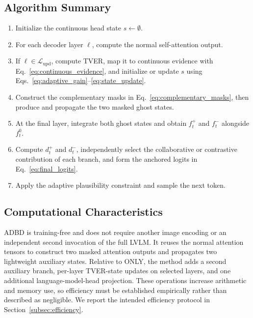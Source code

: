 \subsection{Algorithm Summary}

\begin{enumerate}
    \item Initialize the continuous head state $s\leftarrow\emptyset$.
    \item For each decoder layer $\ell$, compute the normal self-attention output.
    \item If $\ell\in\mathcal{L}_{\mathrm{upd}}$, compute TVER, map it to continuous evidence with Eq.~\eqref{eq:continuous_evidence}, and initialize or update $s$ using Eqs.~\eqref{eq:adaptive_gain}--\eqref{eq:state_update}.
    \item Construct the complementary masks in Eq.~\eqref{eq:complementary_masks}, then produce and propagate the two masked ghost states.
    \item At the final layer, integrate both ghost states and obtain $f_t^{+}$ and $f_t^{-}$ alongside $f_t^{0}$.
    \item Compute $d_t^{+}$ and $d_t^{-}$, independently select the collaborative or contrastive contribution of each branch, and form the anchored logits in Eq.~\eqref{eq:final_logits}.
    \item Apply the adaptive plausibility constraint and sample the next token.
\end{enumerate}

\subsection{Computational Characteristics}

ADBD is training-free and does not require another image encoding or an independent second invocation of the full LVLM. It reuses the normal attention tensors to construct two masked attention outputs and propagates two lightweight auxiliary states. Relative to ONLY, the method adds a second auxiliary branch, per-layer TVER-state updates on selected layers, and one additional language-model-head projection. These operations increase arithmetic and memory use, so efficiency must be established empirically rather than described as negligible. We report the intended efficiency protocol in Section~\ref{subsec:efficiency}.
